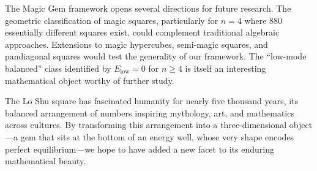 The Magic Gem framework opens several directions for future research.
The geometric classification of magic squares, particularly for $n = 4$ where 880 essentially different squares exist,
could complement traditional algebraic approaches.
Extensions to magic hypercubes, semi-magic squares, and pandiagonal squares 
would test the generality of our framework.
The ``low-mode balanced'' class identified by $E_{\mathrm{low}} = 0$ for $n \geq 4$
is itself an interesting mathematical object worthy of further study.

The Lo Shu square has fascinated humanity for nearly five thousand years,
its balanced arrangement of numbers inspiring mythology, art, and mathematics across cultures.
By transforming this arrangement into a three-dimensional object---a gem 
that sits at the bottom of an energy well, whose very shape encodes perfect equilibrium---we 
hope to have added a new facet to its enduring mathematical beauty.
